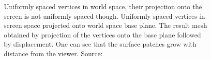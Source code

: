 \begin{figure}
{  \label{fig:hinsinger:projectedgrid:ss}
 }
 \hfill
 \caption{
   Uniformly spaced vertices in world space, their projection onto the screen is not uniformly spaced though.
   Uniformly spaced vertices in screen space projected onto world space base plane.
   The result mesh obtained by projection of the vertices onto the base plane followed by displacement.
  One can see that the surface patches grow with distance from the viewer.
  Source:~\cite{Hinsinger:2002}
}
\label{fig:hinsinger:mesh}
\end{figure}
%
%

